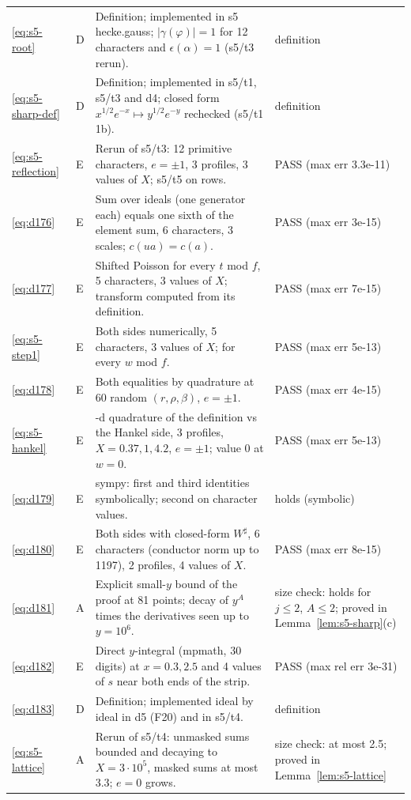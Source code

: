 \documentclass[11pt]{article}
\numberwithin{equation}{section}
\begin{document}
\begin{longtable}{@{}>{\raggedright\arraybackslash}p{1.2cm}>{\centering\arraybackslash}p{0.7cm}>{\raggedright\arraybackslash}p{9.05cm}>{\raggedright\arraybackslash}p{4.3cm}@{}}
\eqref{eq:s5-root} & D & Definition; implemented in s5 hecke.gauss; $|\gamma(\varphi)|=1$ for 12 characters and $\epsilon(\alpha)=1$ (s5/t3 rerun). & definition\\
\eqref{eq:s5-sharp-def} & D & Definition; implemented in s5/t1, s5/t3 and d4; closed form $x^{1/2}e^{-x}\mapsto y^{1/2}e^{-y}$ rechecked (s5/t1 1b). & definition\\
\eqref{eq:s5-reflection} & E & Rerun of s5/t3: 12 primitive characters, $e=\pm1$, 3 profiles, 3 values of $X$; s5/t5 on rows. & PASS (max err 3.3e-11)\\
\eqref{eq:d176} & E & Sum over ideals (one generator each) equals one sixth of the element sum, 6 characters, 3 scales; $c(ua)=c(a)$. & PASS (max err 3e-15)\\
\eqref{eq:d177} & E & Shifted Poisson for every $t$ mod $f$, 5 characters, 3 values of $X$; transform computed from its definition. & PASS (max err 7e-15)\\
\eqref{eq:s5-step1} & E & Both sides numerically, 5 characters, 3 values of $X$; \cite[Lemma~17]{QF} for every $w$ mod $f$. & PASS (max err 5e-13)\\
\eqref{eq:d178} & E & Both equalities by quadrature at 60 random $(r,\rho,\beta)$, $e=\pm1$. & PASS (max err 4e-15)\\
\eqref{eq:s5-hankel} & E & 2-d quadrature of the definition vs the Hankel side, 3 profiles, $X=0.37,1,4.2$, $e=\pm1$; value 0 at $w=0$. & PASS (max err 5e-13)\\
\eqref{eq:d179} & E & sympy: first and third identities symbolically; second on character values. & holds (symbolic)\\
\eqref{eq:d180} & E & Both sides with closed-form $W^\sharp$, 6 characters (conductor norm up to 1197), 2 profiles, 4 values of $X$. & PASS (max err 8e-15)\\
\eqref{eq:d181} & A & Explicit small-$y$ bound of the proof at 81 points; decay of $y^A$ times the derivatives seen up to $y=10^6$. & size check: holds for $j\le2$, $A\le2$; proved in Lemma~\ref{lem:s5-sharp}(c)\\
\eqref{eq:d182} & E & Direct $y$-integral (mpmath, 30 digits) at $x=0.3,2.5$ and 4 values of $s$ near both ends of the strip. & PASS (max rel err 3e-31)\\
\eqref{eq:d183} & D & Definition; implemented ideal by ideal in d5 (F20) and in s5/t4. & definition\\
\eqref{eq:s5-lattice} & A & Rerun of s5/t4: unmasked sums bounded and decaying to $X=3\cdot10^5$, masked sums at most 3.3; $e=0$ grows. & size check: at most 2.5; proved in Lemma~\ref{lem:s5-lattice}\\

\end{longtable}
\end{document}
